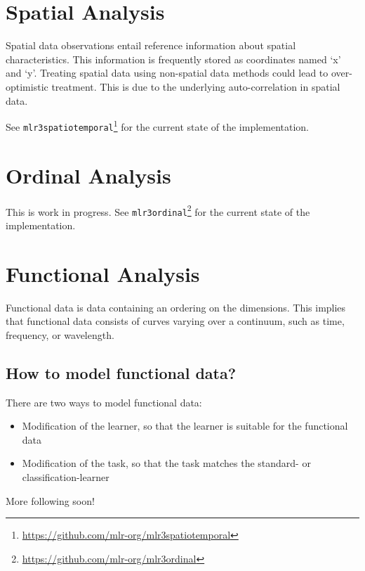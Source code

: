 \documentclass[12pt,]{scrbook}
\providecommand{\tightlist}{%
  \setlength{\itemsep}{0pt}\setlength{\parskip}{0pt}}
\renewcommand{\href}[2]{#2\footnote{\url{#1}}}
\begin{document}
\hypertarget{spatial}{%
\section{Spatial Analysis}\label{spatial}}

Spatial data observations entail reference information about spatial characteristics.
This information is frequently stored as coordinates named `x' and `y'.
Treating spatial data using non-spatial data methods could lead to over-optimistic treatment.
This is due to the underlying auto-correlation in spatial data.

See \href{https://github.com/mlr-org/mlr3spatiotemporal}{\texttt{mlr3spatiotemporal}} for the current state of the implementation.

\hypertarget{ordinal}{%
\section{Ordinal Analysis}\label{ordinal}}

This is work in progress.
See \href{https://github.com/mlr-org/mlr3ordinal}{\texttt{mlr3ordinal}} for the current state of the implementation.

\hypertarget{functional}{%
\section{Functional Analysis}\label{functional}}

Functional data is data containing an ordering on the dimensions.
This implies that functional data consists of curves varying over a continuum, such as time, frequency, or wavelength.

\hypertarget{how-to-model-functional-data}{%
\subsection{How to model functional data?}\label{how-to-model-functional-data}}

There are two ways to model functional data:

\begin{itemize}
\tightlist
\item
  Modification of the learner, so that the learner is suitable for the functional data
\item
  Modification of the task, so that the task matches the standard- or classification-learner
\end{itemize}

More following soon!
\end{document}
